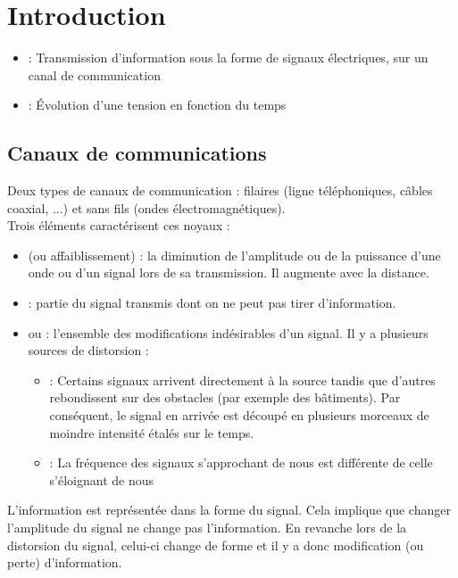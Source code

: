 \chapter{Introduction} %

\begin{itemize}
\item {} : Transmission d'information sous la forme de signaux électriques, sur un canal de communication
\item {} : Évolution d'une tension en fonction du temps
\end{itemize}

\section{Canaux de communications} %

Deux types de canaux de communication : filaires (ligne téléphoniques, câbles coaxial, ...) et sans fils (ondes électromagnétiques).\\
Trois éléments caractérisent ces noyaux :
\begin{itemize}
\item {} (ou affaiblissement) : la diminution de l'amplitude ou de la puissance d'une onde ou d'un signal lors de sa transmission. Il augmente avec la distance.
\item {} : partie du signal transmis dont on ne peut pas tirer d'information.
\item {} ou  : l'ensemble des modifications indésirables d'un signal. Il y a plusieurs sources de distorsion :
	\begin{itemize}
	\item {} : Certains signaux arrivent directement à la source tandis que d'autres rebondissent sur des obstacles (par exemple des bâtiments). Par conséquent, le signal en arrivée est découpé en plusieurs morceaux de moindre intensité étalés sur le temps.
	\item {} : La fréquence des signaux s'approchant de nous est différente de celle s'éloignant de nous
	\end{itemize}
\end{itemize}

L'information est représentée dans la forme du signal. Cela implique que changer l'amplitude du signal ne change pas l'information. En revanche lors de la distorsion du signal, celui-ci change de forme et il y a donc modification (ou perte) d'information.

